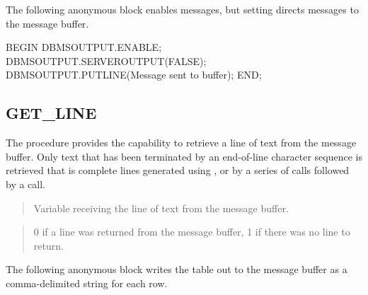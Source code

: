 \documentclass[letterpaper,10pt,english,openany,oneside]{sphinxmanual}
\begin{document}
The following anonymous block enables messages, but setting
 directs messages to the message buffer.

%
\begin{sphinxVerbatim}[commandchars=\\\{\}]
BEGIN
   DBMS\PYGZus{}OUTPUT.ENABLE;
   DBMS\PYGZus{}OUTPUT.SERVEROUTPUT(FALSE);
   DBMS\PYGZus{}OUTPUT.PUT\PYGZus{}LINE(\PYGZsq{}Message sent to buffer\PYGZsq{});
END;
\end{sphinxVerbatim}

\newpage


\subsection{GET\_LINE}
\label{\detokenize{dbms_output:get-line}}
The  procedure provides the capability to retrieve a line of
text from the message buffer. Only text that has been terminated by an
end-of-line character sequence is retrieved \textendash{} that is complete lines
generated using , or by a series of  calls followed by a
 call.
\begin{quote}

\end{quote}


\begin{quote}

Variable receiving the line of text from the message buffer.
\end{quote}

\begin{quote}

0 if a line was returned from the message buffer, 1 if there was no line
to return.
\end{quote}


The following anonymous block writes the  table out to the message
buffer as a comma-delimited string for each row.
\end{document}
